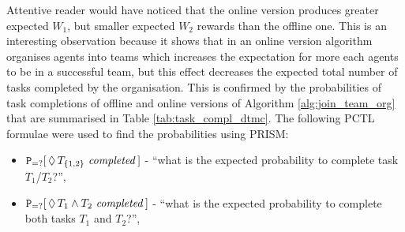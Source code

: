 \documentclass{llncs}
\begin{document}
\begin{table}[H]
 \centering
{}
\caption{Task completion probabilities for optimal agent organisations using Algorithm \ref{alg:join_team_org}'s offline and online versions (see Algorithm \ref{alg:main_process}).}
\label{tab:task_compl_dtmc}
\end{table}

Attentive reader would have noticed that the online version produces greater expected $W_1$, but smaller expected $W_2$ rewards than the offline one. This is an interesting observation because it shows that in an online version algorithm organises agents into teams which increases the expectation for more each agents to be in a successful team, but this effect decreases the expected total number of tasks completed by the organisation. This is confirmed by the probabilities of task completions of offline and online versions of Algorithm \ref{alg:join_team_org} that are summarised in Table \ref{tab:task_compl_dtmc}. The following PCTL formulae were used to find the probabilities using PRISM:
\begin{itemize}
 \item ${\tt P}_{=?}[\,\Diamond\,T_{\{1,2\}} \mathit{\ completed}\,]$ -
``what is the expected probability to complete  task $T_1$/$T_2$?'',
 \item ${\tt P}_{=?}[\,\Diamond\,T_{1} \wedge T_2 \mathit{\ completed}\,]$ -
``what is the expected probability to complete  both tasks $T_1$ and $T_2$?'',
\end{itemize}
\end{document}
